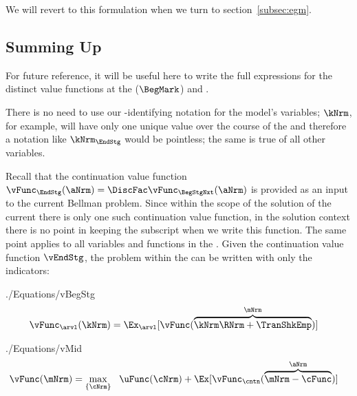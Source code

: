 \documentclass[\econtexRoot/SolvingMicroDSOPs]{subfiles}
\begin{document}
We will revert to this formulation when we turn to section~\ref{subsec:egm}.

\hypertarget{summing-up}{}
\subsection{Summing Up}\label{subsec:summing-up}
For future reference, it will be useful here to write the full expressions for the distinct value functions at the {\Arrival} ($\BegMark$) and {\Decision} {\moves}.  %

There is no need to use our {\interval}-identifying notation for the model's variables; $\kNrm$, for example, will have only one unique value over the course of the {\interval} and therefore a notation like $\kNrm_{\EndStg}$ would be pointless; the same is true of all other variables.

Recall that the continuation value function $\vFunc_{\EndStg}(\aNrm)=\DiscFac \vFunc_{\BegStgNxt}(\aNrm)$ is provided as an input to the current {\stg} Bellman problem.  Since within the scope of the solution of the current {\stg} there is only one such continuation value function, in the solution context there is no point in keeping the {\interval} subscript when we write this function.  The same point applies to all variables and functions in the {\stg}.  Given the continuation value function $\vEndStg$, the problem within the {\stg} can be written with only the {\move} indicators:
\begin{verbatimwrite}{./Equations/vBegStg}
  \begin{equation}\begin{gathered}\begin{aligned}
        \vFunc_{\arvl}(\kNrm) & = \Ex_{\arvl}[\vFunc(\overbrace{\kNrm \RNrm + \TranShkEmp}^{\mNrm})]  \label{eq:vBegStg}
      \end{aligned}\end{gathered}\end{equation}
\end{verbatimwrite}
\unskip
\begin{verbatimwrite}{./Equations/vMid}
  \begin{equation}\begin{gathered}\begin{aligned}
        \vFunc(\mNrm) & = \max_{\{{\cNrm}\}}~~\uFunc(\cNrm) +\Ex[ \vFunc_{\cntn}(\overbrace{\mNrm-\cFunc}^{\aNrm})] \label{eq:vMid}
      \end{aligned}\end{gathered}\end{equation}
\end{verbatimwrite}
\unskip
\end{document}
